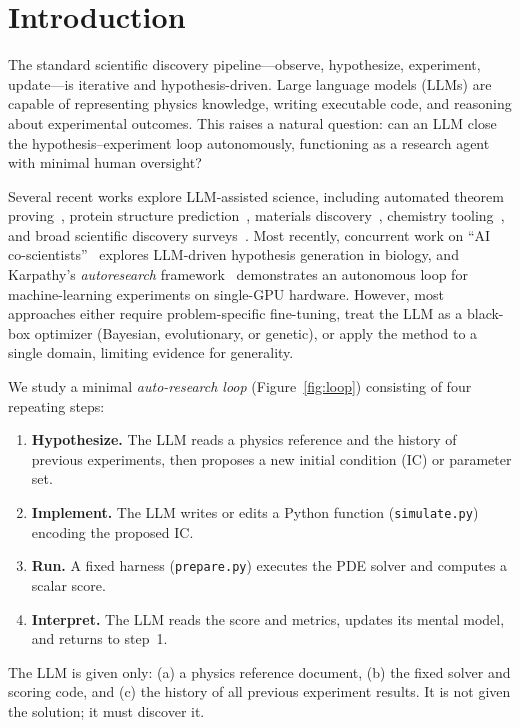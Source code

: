 \documentclass[11pt]{article}
\begin{document}
\section{Introduction}
\label{sec:intro}

The standard scientific discovery pipeline---observe, hypothesize, experiment,
update---is iterative and hypothesis-driven.
Large language models (LLMs) are capable of representing physics knowledge,
writing executable code, and reasoning about experimental outcomes.
This raises a natural question: can an LLM close the hypothesis--experiment loop
autonomously, functioning as a research agent with minimal human oversight?

Several recent works explore LLM-assisted science, including automated theorem
proving~\cite{trinh2024alphageometry}, protein structure
prediction~\cite{jumper2021alphafold}, materials
discovery~\cite{merchant2023scaling}, chemistry
tooling~\cite{bran2023chemcrow}, and broad scientific
discovery surveys~\cite{wang2023scientific}.
Most recently, concurrent work on ``AI co-scientists''~\cite{gottweis2025aiscientist}
explores LLM-driven hypothesis generation in biology, and Karpathy's \emph{autoresearch}
framework~\cite{karpathy2025autoresearch} demonstrates an autonomous loop for
machine-learning experiments on single-GPU hardware.
However, most approaches either require problem-specific fine-tuning, treat
the LLM as a black-box optimizer (Bayesian, evolutionary, or genetic), or
apply the method to a single domain, limiting evidence for generality.

We study a minimal \emph{auto-research loop} (Figure~\ref{fig:loop})
consisting of four repeating steps:
\begin{enumerate}
  \item \textbf{Hypothesize.} The LLM reads a physics reference and the
        history of previous experiments, then proposes a new initial
        condition (IC) or parameter set.
  \item \textbf{Implement.} The LLM writes or edits a Python function
        (\texttt{simulate.py}) encoding the proposed IC.
  \item \textbf{Run.} A fixed harness (\texttt{prepare.py}) executes the PDE
        solver and computes a scalar score.
  \item \textbf{Interpret.} The LLM reads the score and metrics, updates its
        mental model, and returns to step~1.
\end{enumerate}
The LLM is given only: (a) a physics reference document, (b) the fixed solver
and scoring code, and (c) the history of all previous experiment results.
It is not given the solution; it must discover it.
\end{document}
